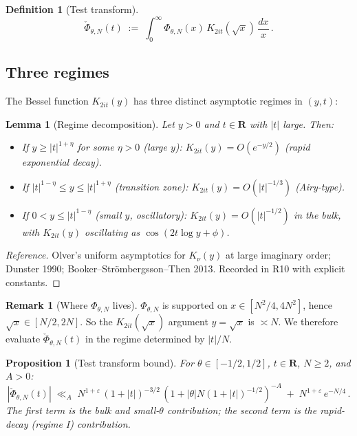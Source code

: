 \documentclass[11pt]{article}
\newtheorem{lemma}[theorem]{Lemma}
\newtheorem{proposition}[theorem]{Proposition}
\theoremstyle{definition}
\newtheorem{definition}[theorem]{Definition}
\newtheorem{remark}[theorem]{Remark}
\newcommand{\R}{\mathbf{R}}
\begin{document}
\begin{definition}[Test transform]\label{def:check-Phi}
\[
   \check\Phi_{\theta,N}(t)\;:=\;\int_0^\infty\Phi_{\theta,N}(x)\,K_{2it}(\sqrt x)\,\frac{dx}{x}\,.
\]
\end{definition}

\subsection{Three regimes}\label{ssec:regimes}

The Bessel function $K_{2it}(y)$ has three distinct asymptotic regimes in $(y,t)$:

\begin{lemma}[Regime decomposition]\label{lem:regimes}
Let $y>0$ and $t\in\R$ with $|t|$ large. Then:
\begin{itemize}
\item[(I)] If $y\ge|t|^{1+\eta}$ for some $\eta>0$ (large $y$): $K_{2it}(y)=O(e^{-y/2})$ (rapid exponential decay).
\item[(II)] If $|t|^{1-\eta}\le y\le|t|^{1+\eta}$ (transition zone): $K_{2it}(y)=O(|t|^{-1/3})$ (Airy-type).
\item[(III)] If $0<y\le|t|^{1-\eta}$ (small $y$, oscillatory): $K_{2it}(y)=O(|t|^{-1/2})$ in the bulk, with $K_{2it}(y)$ oscillating as $\cos(2t\log y+\phi)$.
\end{itemize}
\end{lemma}

\begin{proof}[Reference]
Olver's uniform asymptotics for $K_\nu(y)$ at large imaginary order; Dunster 1990; Booker--Strömbergsson--Then 2013. Recorded in R10 with explicit constants.
\end{proof}

\begin{remark}[Where $\Phi_{\theta,N}$ lives]\label{rem:phi-support}
$\Phi_{\theta,N}$ is supported on $x\in[N^2/4,4N^2]$, hence $\sqrt x\in[N/2,2N]$. So the $K_{2it}(\sqrt x)$ argument $y=\sqrt x$ is $\asymp N$. We therefore evaluate $\check\Phi_{\theta,N}(t)$ in the regime determined by $|t|/N$.
\end{remark}

\begin{proposition}[Test transform bound]\label{prop:phase-bound}
For $\theta\in[-1/2,1/2]$, $t\in\R$, $N\ge 2$, and $A>0$:
\[
   |\check\Phi_{\theta,N}(t)|\;\ll_A\;N^{1+\varepsilon}\,(1+|t|)^{-3/2}\,(1+|\theta|N(1+|t|)^{-1/2})^{-A}\;+\;N^{1+\varepsilon}\,e^{-N/4}\,.
\]
The first term is the bulk and small-$\theta$ contribution; the second term is the rapid-decay (regime I) contribution.
\end{proposition}
\end{document}
